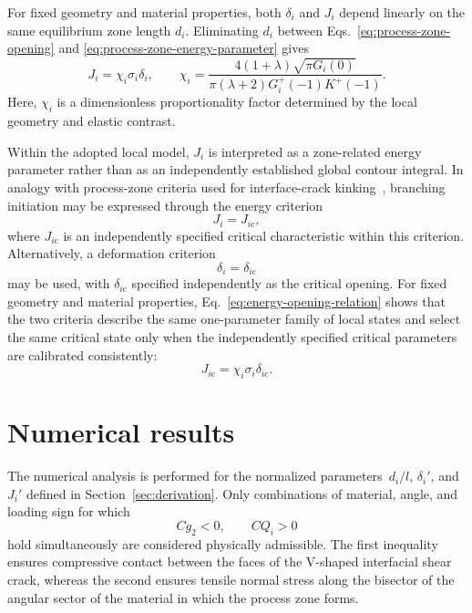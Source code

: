 \documentclass[pdflatex,onecolumn,sn-mathphys-ay]{sn-jnl}
\begin{document}
For fixed geometry and material properties, both $\delta_i$ and $J_i$
depend linearly on the same equilibrium zone length $d_i$. Eliminating
$d_i$ between Eqs.~\eqref{eq:process-zone-opening} and
\eqref{eq:process-zone-energy-parameter} gives
\begin{equation}
\label{eq:energy-opening-relation}
  J_i=\chi_i\sigma_i\delta_i,
  \qquad
  \chi_i=
  \frac{4(1+\lambda)\sqrt{\pi G_i(0)}}
  {\pi(\lambda+2)G_i^+(-1)K^+(-1)}.
\end{equation}
Here, $\chi_i$ is a dimensionless proportionality factor determined by
the local geometry and elastic contrast.

Within the adopted local model, $J_i$ is interpreted as a zone-related
energy parameter rather than as an independently established global contour
integral. In analogy with process-zone criteria used for interface-crack
kinking~\citep{KaminskyEtAl2023}, branching initiation may be expressed
through the energy criterion
\begin{equation*}
  J_i=J_{i\mathrm{c}},
\end{equation*}
where $J_{i\mathrm{c}}$ is an independently specified critical
characteristic within this criterion. Alternatively, a deformation criterion
\begin{equation*}
  \delta_i=\delta_{i\mathrm{c}}
\end{equation*}
may be used, with $\delta_{i\mathrm{c}}$ specified independently as the
critical opening. For fixed geometry and material properties,
Eq.~\eqref{eq:energy-opening-relation} shows that the two criteria
describe the same one-parameter family of local states and select the
same critical state only when the independently specified critical
parameters are calibrated consistently:
\begin{equation*}
  J_{i\mathrm{c}}
  =\chi_i\sigma_i\delta_{i\mathrm{c}}.
\end{equation*}


\section{Numerical results}
\label{sec:numerical-results}

The numerical analysis is performed for the normalized parameters
$\,d_i/l$, $\delta_i'$, and $J_i'$ defined in
Section~\ref{sec:derivation}. Only combinations of material, angle, and
loading sign for which
\begin{equation*}
  Cg_2<0,\qquad CQ_i>0
\end{equation*}
hold simultaneously are considered physically admissible. The first
inequality ensures compressive contact between the faces of the V-shaped
interfacial shear crack, whereas the second ensures tensile normal stress
along the bisector of the angular sector of the material in which the
process zone forms.
\end{document}
